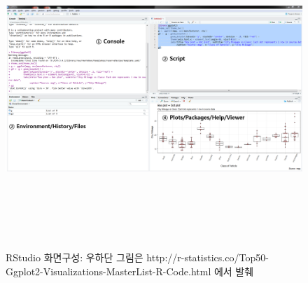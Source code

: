 \documentclass[11pt,a4paper]{book}
\theoremstyle{definition}
\theoremstyle{definition}
\theoremstyle{definition}
\theoremstyle{remark}
\begin{document}
\begin{figure}[H]
{
  \centering
  \includegraphics[width = 14cm, height = 12cm]{Figures/Rstudio-cap1.png}
  \caption[RStudio 화면구성]{RStudio 화면구성: 우하단 그림은 http://r-statistics.co/Top50-Ggplot2-Visualizations-MasterList-R-Code.html 에서 발췌}\label{fig:Rstudio-part-01}
}
\end{figure}
\end{document}
